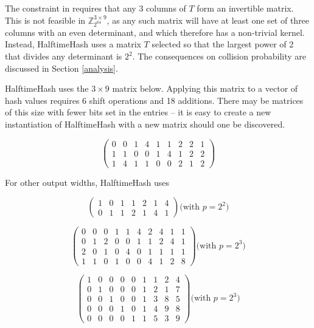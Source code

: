\documentclass[runningheads]{llncs}
\newcommand{\ints}{\mathbb{Z}}
\begin{document}
The constraint in \cite{ehc-nandi} requires that any 3 columns of $T$ form an invertible matrix.
This is not feasible in $\ints_{2^{64}}^{3 \times 9}$, as any such matrix will have at least one set of three columns with an even determinant, and which therefore has a non-trivial kernel.
Instead, HalftimeHash uses a matrix $T$ selected so that the largest power of 2 that divides any determinant is $2^2$.
The consequences on collision probability are discussed in Section \ref{analysis}.

HalftimeHash uses the $3 \times 9$ matrix below.
Applying this matrix to a vector of hash values requires 6 shift operations and 18 additions.
There may be matrices of this size with fewer bits set in the entries -- it is easy to create a new instantiation of HalftimeHash with a new matrix should one be discovered.

\begin{displaymath}
  \left(
\begin{array}{rrrrrrrrr}
  0 & 0 & 1 & 4 & 1 & 1 & 2 & 2 & 1\\
  1 & 1 & 0 & 0 & 1 & 4 & 1 & 2 & 2\\
  1 & 4 & 1 & 1 & 0 & 0 & 2 & 1 & 2
\end{array}
\right)
\end{displaymath}

For other output widths, HalftimeHash uses

\[
\left(
\begin{array}{rrrrrrrrrrrr}
  1 & 0 & 1 & 1 & 2 & 1 & 4\\
  0 & 1 & 1 & 2 & 1 & 4 & 1
\end{array}
\right)
\textrm{(with $p = 2^2$)}
\]

\[
\left(
\begin{array}{rrrrrrrrrr}
 0 & 0 & 0 & 1 & 1 & 4 & 2 & 4 & 1 & 1 \\
 0 & 1 & 2 & 0 & 0 & 1 & 1 & 2 & 4 & 1 \\
 2 & 0 & 1 & 0 & 4 & 0 & 1 & 1 & 1 & 1 \\
 1 & 1 & 0 & 1 & 0 & 0 & 4 & 1 & 2 & 8
\end{array}
\right)
\textrm{(with $p = 2^3$)}
\]

\[
\left(
\begin{array}{rrrrrrrrr}
 1 & 0 & 0 & 0 & 0 & 1 & 1 & 2 & 4\\
 0 & 1 & 0 & 0 & 0 & 1 & 2 & 1 & 7\\
 0 & 0 & 1 & 0 & 0 & 1 & 3 & 8 & 5\\
 0 & 0 & 0 & 1 & 0 & 1 & 4 & 9 & 8\\
 0 & 0 & 0 & 0 & 1 & 1 & 5 & 3 & 9
\end{array}
\right)
\textrm{(with $p = 2^3$)}
\]
\end{document}
